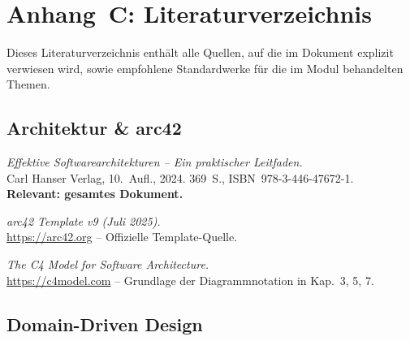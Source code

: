 
\section{Anhang~C: Literaturverzeichnis}
\label{sec:literaturverzeichnis}

\begin{hinweis}[Lehrhinweis]
  Dieses Literaturverzeichnis enthält alle Quellen, auf die im Dokument explizit
  verwiesen wird, sowie empfohlene Standardwerke für die im Modul behandelten
  Themen.
\end{hinweis}

\subsection*{Architektur \& arc42}

\begin{description}[leftmargin=2em, style=nextline]
  \item[Starke, G. (2024)]
  \textit{Effektive Softwarearchitekturen -- Ein praktischer Leitfaden.}\\
  Carl Hanser Verlag, 10.~Aufl., 2024. 369~S.,
  ISBN~978-3-446-47672-1.\\
  \textbf{Relevant: gesamtes Dokument.}

  \item[arc42.org (2025)]
  \textit{arc42 Template v9 (Juli 2025).}\\
  \url{https://arc42.org} -- Offizielle Template-Quelle.

  \item[Brown, S. (2018)]
  \textit{The C4 Model for Software Architecture.}\\
  \url{https://c4model.com} -- Grundlage der Diagrammnotation in Kap.~3, 5, 7.
\end{description}

\subsection*{Domain-Driven Design}


